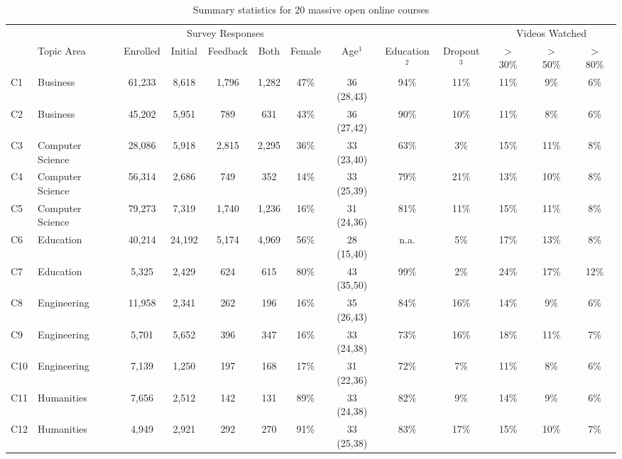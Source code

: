 \documentclass{sigchi}\usepackage[]{graphicx}\usepackage[]{color}
\begin{document}
\begin{table}[th]
\caption{Summary statistics for 20 massive open online courses}
\small
\center
\label{tab:s1sum}
\begin{tabular}{llccccccccccc}
\toprule
 &            &          & \multicolumn{3}{c}{Survey Responses} & & & & & \multicolumn{3}{c}{Videos Watched} \\
 \cmidrule(r){4-6} \cmidrule(r){11-13}
 & Topic Area & Enrolled & Initial & Feedback & Both & Female & Age$^1$   & Education$^2$ & Dropout$^3$ & $>$ 30\% & $>$ 50\% & $>$ 80\% \\
\midrule
C1 & Business & 61,233 & 8,618 & 1,796 & 1,282 & 47\% & 36 (28,43) & 94\% & 11\% & 11\% & 9\% & 6\%\\
C2 & Business & 45,202 & 5,951 & 789 & 631 & 43\% & 36 (27,42) & 90\% & 10\% & 11\% & 8\% & 6\%\\
C3 & Computer Science & 28,086 & 5,918 & 2,815 & 2,295 & 36\% & 33 (23,40) & 63\% & 3\% & 15\% & 11\% & 8\%\\
C4 & Computer Science & 56,314 & 2,686 & 749 & 352 & 14\% & 33 (25,39) & 79\% & 21\% & 13\% & 10\% & 8\%\\
C5 & Computer Science & 79,273 & 7,319 & 1,740 & 1,236 & 16\% & 31 (24,36) & 81\% & 11\% & 15\% & 11\% & 8\%\\
C6 & Education & 40,214 & 24,192 & 5,174 & 4,969 & 56\% & 28 (15,40) & n.a. & 5\% & 17\% & 13\% & 8\%\\
C7 & Education & 5,325 & 2,429 & 624 & 615 & 80\% & 43 (35,50) & 99\% & 2\% & 24\% & 17\% & 12\%\\
C8 & Engineering & 11,958 & 2,341 & 262 & 196 & 16\% & 35 (26,43) & 84\% & 16\% & 14\% & 9\% & 6\%\\
C9 & Engineering & 5,701 & 5,652 & 396 & 347 & 16\% & 33 (24,38) & 73\% & 16\% & 18\% & 11\% & 7\%\\
C10 & Engineering & 7,139 & 1,250 & 197 & 168 & 17\% & 31 (22,36) & 72\% & 7\% & 11\% & 8\% & 6\%\\
C11 & Humanities & 7,656 & 2,512 & 142 & 131 & 89\% & 33 (24,38) & 82\% & 9\% & 14\% & 9\% & 6\%\\
C12 & Humanities & 4,949 & 2,921 & 292 & 270 & 91\% & 33 (25,38) & 83\% & 17\% & 15\% & 10\% & 7\%\\

\end{tabular}
\end{table}
\end{document}
